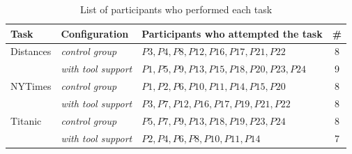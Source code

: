 


\begin{table}[h!]
\centering
\caption{List of participants who performed each task}
\begin{scriptsize}
\begin{tabular}{lllc}
\hline
\textbf{Task} & \textbf{Configuration} & \textbf{Participants who attempted the task} & \textbf{\#}                                                                              \\
\hline
\hline
%
%
\parbox[l][0.5cm][c]{1cm}{Distances}
& \textit{control group}        & $P3, P4, P8, P12, P16, P17,  P21, P22$  & 8 \\
\parbox[l][0.5cm][c]{1cm}{}
& \textit{with tool support}    & $P1, P5, P9, P13, P15, P18, P20, P23, P24$ & 9 \\
\hline
%
%
\parbox[l][0.5cm][c]{1cm}{NYTimes}
& \textit{control group}     & $P1, P2, P6, P10, P11, P14, P15, P20$ & 8 \\
\parbox[l][0.5cm][c]{1cm}{}
& \textit{with tool support} & $P3, P7, P12, P16, P17, P19, P21,  P22$ & 8 \\
\hline
%
%
\parbox[l][0.5cm][c]{1cm}{Titanic}       
& \textit{control group}     & $P5, P7, P9, P13, P18, P19, P23, P24$ & 8 \\
\parbox[l][0.5cm][c]{1cm}{}
& \textit{with tool support} & $P2, P4, P6, P8, P10, P11,  P14$ & 7 \\
\hline
%
%
\end{tabular}
\end{scriptsize}
\smallskip
\label{tbl:python-task-distribution}
\end{table}

    




